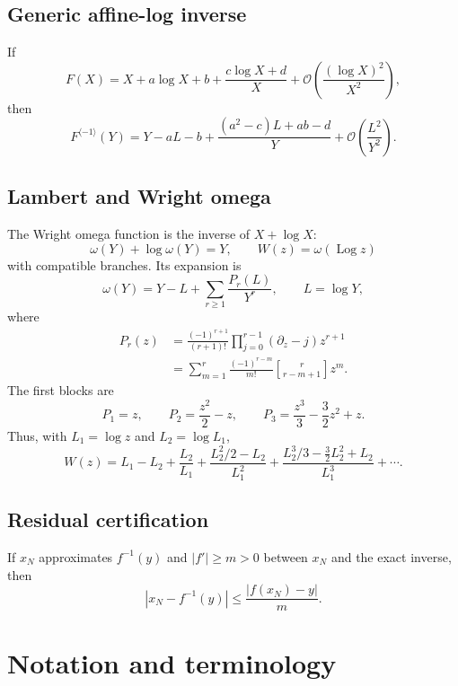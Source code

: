 \documentclass[11pt,oneside]{book}
\theoremstyle{definition}
\theoremstyle{remark}
\DeclareMathOperator{\Log}{Log}
\newcommand{\bigO}{\mathcal O}
\newcommand{\compinv}{^{\langle-1\rangle}}
\newcommand{\stirlingone}[2]{\genfrac{[}{]}{0pt}{}{#1}{#2}}
\begin{document}
\section*{Generic affine-log inverse}
If
\[
 F(X)=X+a\log X+b
 +\frac{c\log X+d}{X}
 +\bigO\!\left(\frac{(\log X)^2}{X^2}\right),
\]
then
\[
 F\compinv(Y)
 =Y-aL-b
 +\frac{(a^2-c)L+ab-d}{Y}
 +\bigO\!\left(\frac{L^2}{Y^2}\right).
\]

\section*{Lambert and Wright omega}
The Wright omega function is the inverse of $X+\log X$:
\[
 \omega(Y)+\log\omega(Y)=Y,\qquad
 W(z)=\omega(\Log z)
\]
with compatible branches. Its expansion is
\[
 \omega(Y)=Y-L+\sum_{r\ge1}\frac{P_r(L)}{Y^r},
 \qquad L=\log Y,
\]
where
\begin{align*}
 P_r(z)
 &=\frac{(-1)^{r+1}}{(r+1)!}
   \prod_{j=0}^{r-1}(\partial_z-j)z^{r+1}\\
 &=\sum_{m=1}^r
   \frac{(-1)^{r-m}}{m!}
   \stirlingone{r}{r-m+1}z^m.
\end{align*}
The first blocks are
\[
 P_1=z,\qquad
 P_2=\frac{z^2}{2}-z,\qquad
 P_3=\frac{z^3}{3}-\frac32z^2+z.
\]
Thus, with $L_1=\log z$ and $L_2=\log L_1$,
\[
 W(z)=L_1-L_2+\frac{L_2}{L_1}
 +\frac{L_2^2/2-L_2}{L_1^2}
 +\frac{L_2^3/3-\frac32L_2^2+L_2}{L_1^3}
 +\cdots.
\]

\section*{Residual certification}
If $x_N$ approximates $f^{-1}(y)$ and
$|f'|\ge m>0$ between $x_N$ and the exact inverse, then
\[
 |x_N-f^{-1}(y)|
 \le\frac{|f(x_N)-y|}{m}.
\]

\chapter{Notation and terminology}
\label{app:notation}
\end{document}
